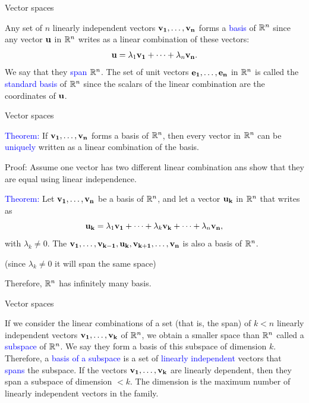 \documentclass[11pt,aspectratio=169]{beamer}
\begin{document}
\begin{frame}{Vector spaces}

Any set of $n$ linearly independent vectors $\bf{v}_1,\dots, \bf{v}_n$ forms a \textcolor{blue}{basis} of $\mathbb R^n$ since any vector $\bf{u}$ in $\mathbb R^n$ writes as a linear combination of these vectors:
$$
{\bf u}=\lambda_1 {\bf v_1}+\cdots+\lambda_n {\bf v_n}. 
$$
We  say that they \textcolor{blue}{span} $\mathbb R^n$.
\vskip 12pt
The set of unit vectors $\bf{e}_1, \dots, \bf{e}_n$ in $\mathbb R^n$ is called the \textcolor{blue}{standard basis} of $\mathbb R^n$ since the scalars of the linear combination are the coordinates of $\bf{u}$.
\end{frame}

\begin{frame}{Vector spaces}




\textcolor{blue}{Theorem:} If $\bf{v}_1,\dots, \bf{v}_n$ forms a basis of $\mathbb R^n$, then every vector in $\mathbb R^n$ 
can be \textcolor{blue}{uniquely} written as a linear combination of the basis. 

\begin{tiny}Proof: Assume one vector has two different linear combination ans show that they are equal using linear independence.\end{tiny}
\vskip 12pt
\textcolor{blue}{Theorem:} Let $\bf{v}_1,\dots, \bf{v}_n$ be a basis of $\mathbb R^n$, and let a vector  $\bf{u}_k$ in $\mathbb R^n$ that writes as
$$
{\bf u_k}= \lambda_1{\bf v_1}+\cdots+\lambda_k{\bf v_k}+\cdots +\lambda_n {\bf v_n},
$$
with $\lambda_k \neq 0$. The $\bf{v}_1,\dots,\bf{v}_{k-1}, \bf{u}_k, \bf{v}_{k+1}, \dots,\bf{v}_n$ is also a basis of $\mathbb R^n$. \begin{tiny}(since $\lambda_k \neq 0$ it will span the same space) \end{tiny}
\vskip 12pt
Therefore, $\mathbb R^n$ has infinitely many basis.
\end{frame}




\begin{frame}{Vector spaces}

If we consider the  linear combinations of a set (that is, the span) of $k<n$ linearly independent vectors $\bf{v}_1,\dots, \bf{v}_k$ of $\mathbb R^n$, we obtain a smaller space than $\mathbb R^n$ called a \textcolor{blue}{subspace} of $\mathbb R^n$. We say they form a basis of this subspace of dimension $k$.
\vskip 12pt
Therefore, a \textcolor{blue}{basis of a subspace} is a set  of \textcolor{blue}{linearly independent} vectors that \textcolor{blue}{spans}  the subspace.
\vskip 12pt
If the  vectors $\bf{v}_1,\dots, \bf{v}_k$ are linearly dependent, then they span a subspace of dimension $<k$. The dimension is the maximum number of linearly independent vectors in the family.
\end{frame}
\end{document}
